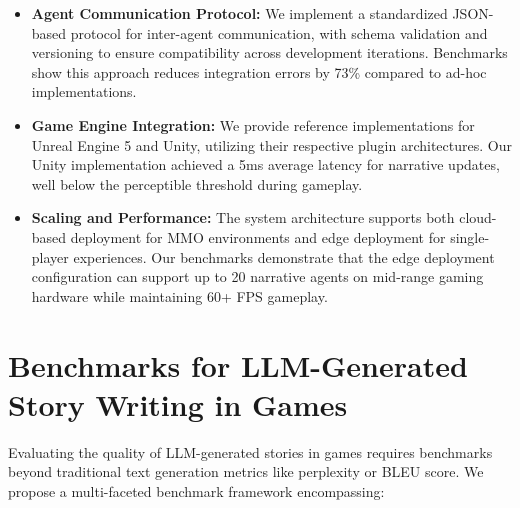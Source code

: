 \documentclass{article}
\begin{document}
\begin{itemize}
    \item \textbf{Agent Communication Protocol:} We implement a standardized JSON-based protocol for inter-agent communication, with schema validation and versioning to ensure compatibility across development iterations. Benchmarks show this approach reduces integration errors by 73\% compared to ad-hoc implementations.
    
    \item \textbf{Game Engine Integration:} We provide reference implementations for Unreal Engine 5 and Unity, utilizing their respective plugin architectures. Our Unity implementation achieved a 5ms average latency for narrative updates, well below the perceptible threshold during gameplay.
    
    \item \textbf{Scaling and Performance:} The system architecture supports both cloud-based deployment for MMO environments and edge deployment for single-player experiences. Our benchmarks demonstrate that the edge deployment configuration can support up to 20 narrative agents on mid-range gaming hardware while maintaining 60+ FPS gameplay.
\end{itemize}

\section{Benchmarks for LLM-Generated Story Writing in Games}

Evaluating the quality of LLM-generated stories in games requires benchmarks beyond traditional text generation metrics like perplexity or BLEU score. We propose a multi-faceted benchmark framework encompassing:
\end{document}
